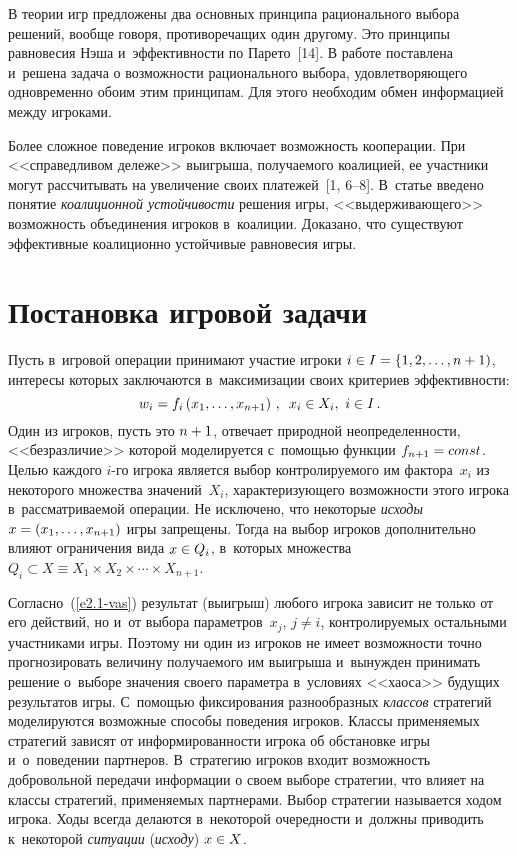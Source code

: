 \begin{multicols}{2}
    В теории игр предложены два основных принципа рационального выбора
решений, вообще говоря, противоречащих один другому. Это принципы равновесия
Нэша и~эффективности по Парето~[14]. В работе поставлена и~решена задача о
возможности рационального выбора, удовлетворяющего одновременно обоим этим
принципам. Для этого необходим обмен информацией между игроками.

    Более сложное поведение игроков включает возмож\-ность кооперации. При
<<справедливом дележе>> выигрыша, получаемого коалицией, ее участники могут
рассчитывать на увеличение своих плате\-жей~[1, 6--8].
В~статье введено понятие \textit{коалиционной устойчивости} решения игры,
<<выдерживающего>> возможность объединения игроков в~коалиции. Доказано,
что существуют эффективные коалиционно устойчивые равновесия игры.

\section{Постановка игровой задачи }

    Пусть в~игровой операции принимают участие игроки $i\hm\in I\hm= \{
1,2,\ldots, n+1)$, интересы которых заключаются в~максимизации своих критериев
эффективности:
    \begin{equation}
    w_i= f_i\left( x_1,\ldots ,x_{n+1}\right)\,,\enskip x_i\in X_i,\ i\in I\,.
    \label{e2.1-vas}
    \end{equation}
Один из игроков, пусть это $n\hm+1$, отвечает природной неопределенности,
<<безразличие>> которой моделируется с~по\-мощью функции $f_{n+1}\hm=
const$. Целью каждого $i$-го игрока является выбор контролируемого им
фактора~$x_i$ из некоторого множества значений~$X_i$, характеризующего
возможности этого игрока в~рассматриваемой операции. Не исключено, что
некоторые \textit{исходы} $x\hm= (x_1,\ldots, x_{n+1})$ игры запрещены. Тогда на
выбор игроков дополнительно влияют ограничения вида $x\hm\in Q_i$, в~которых
множества $Q_i\subset X\equiv X_1\times X_2\times \cdots \times X_{n+1}$.

    Согласно~(\ref{e2.1-vas}) результат (выигрыш) любого игрока зависит не
только от его действий, но и~от выбора параметров~$x_j$, $j\not= i$,
контролируемых остальными участниками игры. Поэтому ни один из игроков не
имеет возможности точно прогнозировать величину получаемого им
выигрыша и~вынужден принимать решение о~выборе значения своего
па\-ра\-мет\-ра в~условиях
<<хаоса>> будущих результатов игры. С~по\-мощью фиксирования разнообразных
\textit{классов} стратегий моделируются возможные способы поведения игроков.
Классы применяемых стратегий зависят от информированности игрока об
обстановке игры и~о~поведении партнеров. В~стратегию игроков входит
возможность добровольной передачи информации о своем выборе стратегии, что
влияет на классы стратегий, применяемых партнерами. Выбор стратегии называется
ходом игрока. Ходы всегда делаются в~некоторой очередности и~должны приводить
к~некоторой \textit{ситуации} (\textit{исходу}) $x\hm\in X$.


\end{multicols}
